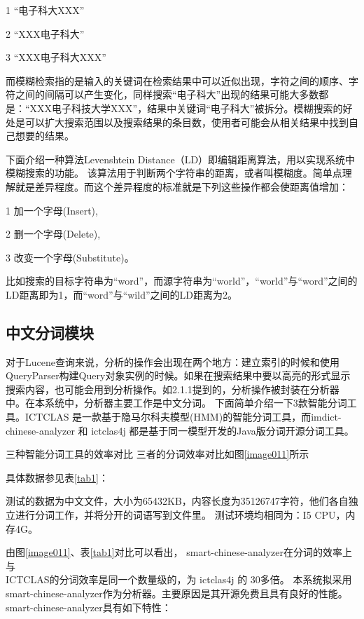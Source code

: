 1 “电子科大XXX”

2 “XXX电子科大”

3 “XXX电子科大XXX”

而模糊检索指的是输入的关键词在检索结果中可以近似出现，字符之间的顺序、字符之间的间隔可以产生变化，同样搜索“电子科大”出现的结果可能大多数都是：“XXX电子科技大学XXX”，结果中关键词“电子科大”被拆分。模糊搜索的好处是可以扩大搜索范围以及搜索结果的条目数，使用者可能会从相关结果中找到自己想要的结果。

下面介绍一种算法Levenshtein Distance（LD）即编辑距离算法，用以实现系统中模糊搜索的功能。
该算法用于判断两个字符串的距离，或者叫模糊度。简单点理解就是差异程度。而这个差异程度的标准就是下列这些操作都会使距离值增加：

1 加一个字母(Insert),

2 删一个字母(Delete),

3 改变一个字母(Substitute)。

比如搜索的目标字符串为“word”，而源字符串为“world”，“world”与“word”之间的LD距离即为1，而“word”与“wild”之间的LD距离为2。

\subsection{中文分词模块}
对于Lucene查询来说，分析的操作会出现在两个地方：建立索引的时候和使用QueryParser构建Query对象实例的时候。如果在搜索结果中要以高亮的形式显示搜索内容，也可能会用到分析操作。如2.1.1提到的，分析操作被封装在分析器中。在本系统中，分析器主要工作是中文分词。
下面简单介绍一下3款智能分词工具。ICTCLAS 是一款基于隐马尔科夫模型(HMM)的智能分词工具，而imdict-chinese-analyzer 和 ictclas4j 都是基于同一模型开发的Java版分词开源分词工具。


三种智能分词工具的效率对比
三者的分词效率对比如图\ref{image011}所示

具体数据参见表\ref{tab1}：

测试的数据为中文文件，大小为65432KB，内容长度为35126747字符，他们各自独立进行分词工作，并将分开的词语写到文件里。
测试环境均相同为：I5 CPU，内存4G。

由图\ref{image011}、表\ref{tab1}对比可以看出， smart-chinese-analyzer在分词的效率上与\\ICTCLAS的分词效率是同一个数量级的，为 ictclas4j 的 30多倍。
本系统拟采用smart-chinese-analyzer作为分析器。主要原因是其开源免费且具有良好的性能。smart-chinese-analyzer具有如下特性：

